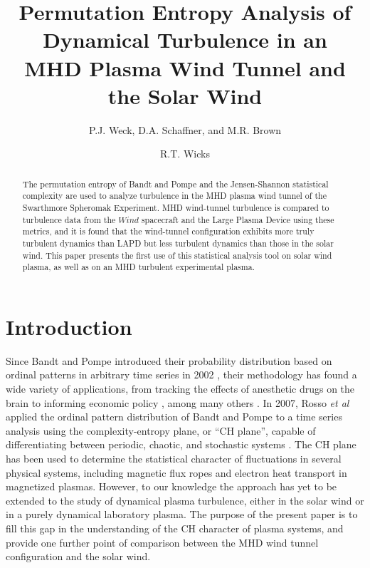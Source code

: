 \documentclass[aps,pre,twocolumn,secnumarabic,nobalancelastpage,amsmath,amssymb,
nofootinbib]{revtex4-1}
\begin{document}
\title{Permutation Entropy Analysis of Dynamical Turbulence in an  \\MHD Plasma Wind Tunnel and the Solar Wind}
\author{P.J. Weck, D.A. Schaffner, and M.R. Brown}
\author{R.T. Wicks}
\begin{abstract}
The permutation entropy of Bandt and Pompe and the Jensen-Shannon statistical complexity are used to analyze turbulence in the MHD plasma wind tunnel of the Swarthmore Spheromak Experiment. MHD wind-tunnel turbulence is compared to turbulence data from the $\textit{Wind} $ spacecraft and the Large Plasma Device using these metrics, and it is found that the wind-tunnel configuration exhibits more truly turbulent dynamics than LAPD but less turbulent dynamics than those in the solar wind. This paper presents the first use of this statistical analysis tool on solar wind plasma, as well as on an MHD turbulent experimental plasma.
\end{abstract}
\maketitle

\section{Introduction}
Since Bandt and Pompe introduced their probability distribution based on ordinal patterns in arbitrary time series in 2002 \cite{bandt2002}, their methodology has found a wide variety of applications, from tracking the effects of anesthetic drugs on the brain \cite{li2010,jordan2008,olofsen2008} to informing economic policy \cite{bariviera2013,zunino2010,zunino2011}, among many others \cite{kowalski2007,soriano2011,saco2010,suyal2012,sun2010}. In 2007, Rosso \textit{et al} applied the ordinal pattern distribution of Bandt and Pompe to a time series analysis using the complexity-entropy plane, or “CH plane”, capable of differentiating between periodic, chaotic, and stochastic systems \cite{rosso2007}. The CH plane has been used to determine the statistical character of fluctuations in several physical systems, including magnetic flux ropes \cite{gekelman2014} and electron heat transport \cite{maggs2013} in magnetized plasmas. However, to our knowledge the approach has yet to be extended to the study of dynamical plasma turbulence, either in the solar wind or in a purely dynamical laboratory plasma. The purpose of the present paper is to fill this gap in the understanding of the CH character of plasma systems, and provide one further point of comparison between the MHD wind tunnel configuration and the solar wind.
\end{document}
